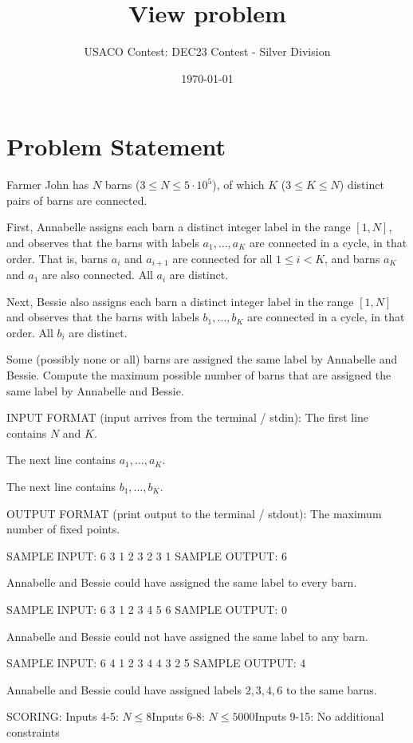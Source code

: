 \documentclass[12pt]{article}
\title{View problem}
\author{USACO Contest: DEC23 Contest - Silver Division}
\date{\today}
\begin{document}
\maketitle

\section*{Problem Statement}


Farmer John has $N$ barns ($3\le N\le 5\cdot 10^5$), of which $K$
($3\le K\le N$) distinct pairs of barns are connected.

First, Annabelle assigns each barn a distinct integer label in the range
$[1,N]$, and observes that the barns with labels $a_1,\dots,a_K$  are connected
in a cycle, in that order. That is, barns $a_i$ and $a_{i+1}$ are connected for
all $1\le i<K$, and barns $a_K$ and $a_1$ are also connected. All $a_i$ are
distinct.

Next, Bessie also assigns each barn a distinct integer label in the range
$[1,N]$ and observes that the barns with labels $b_1,\dots,b_K$ are connected in
a cycle, in that order. All $b_i$ are distinct.

Some (possibly none or all) barns are assigned the same label by Annabelle and
Bessie. Compute the maximum possible number of barns that are assigned the same
label by Annabelle and Bessie.

INPUT FORMAT (input arrives from the terminal / stdin):
The first line contains $N$ and $K$.

The next line contains $a_1,\dots, a_K$. 

The next line contains $b_1,\dots, b_K$.


OUTPUT FORMAT (print output to the terminal / stdout):
The maximum number of fixed points.

SAMPLE INPUT:
6 3
1 2 3
2 3 1
SAMPLE OUTPUT: 
6

Annabelle and Bessie could have assigned the same label to every barn.

SAMPLE INPUT:
6 3
1 2 3
4 5 6
SAMPLE OUTPUT: 
0

Annabelle and Bessie could not have assigned the same label to any barn.

SAMPLE INPUT:
6 4
1 2 3 4
4 3 2 5
SAMPLE OUTPUT: 
4

Annabelle and Bessie could have assigned labels $2,3,4,6$ to the same barns.

SCORING:
Inputs 4-5: $N \le 8$Inputs 6-8: $N \le 5000$Inputs
9-15: No additional constraints
\end{document}
